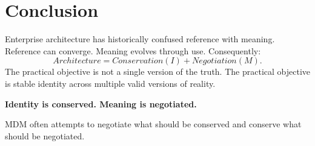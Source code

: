 \documentclass[11pt]{article}
\begin{document}
\section{Conclusion}
Enterprise architecture has historically confused reference with meaning. Reference can converge. Meaning evolves through use. Consequently:
\[
Architecture = Conservation(I) + Negotiation(M).
\]
The practical objective is not a single version of the truth. The practical objective is stable identity across multiple valid versions of reality.

\begin{center}
\Large \textbf{Identity is conserved. Meaning is negotiated.}
\end{center}

MDM often attempts to negotiate what should be conserved and conserve what should be negotiated.
\end{document}
